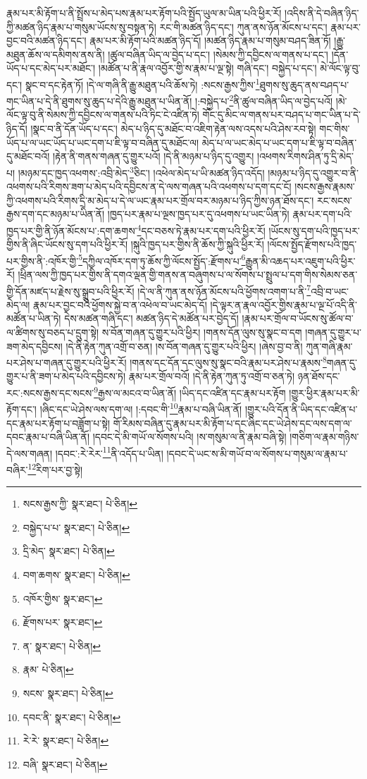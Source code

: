 རྣམ་པར་མི་རྟོག་པ་ནི་སྤྲོས་པ་མེད་པས་རྣམ་པར་རྟོག་པའི་སྤྱོད་ཡུལ་མ་ཡིན་པའི་ཕྱིར་རོ། །འདིས་ནི་དེ་བཞིན་ཉིད་ཀྱི་མཚན་ཉིད་རྣམ་པ་གསུམ་ཡོངས་སུ་བསྟན་ཏེ། རང་གི་མཚན་ཉིད་དང་། ཀུན་ནས་ཉོན་མོངས་པ་དང་། རྣམ་པར་བྱང་བའི་མཚན་ཉིད་དང་། རྣམ་པར་མི་རྟོག་པའི་མཚན་ཉིད་དོ། །མཚན་ཉིད་རྣམ་པ་གསུམ་བཤད་ཟིན་ཏོ། །རྒྱུ་མཐུན་ཆོས་ལ་དམིགས་ནས་ནི། །ཚུལ་བཞིན་ཡིད་ལ་བྱེད་པ་དང་། །སེམས་ཀྱི་དབྱིངས་ལ་གནས་པ་དང་། །དོན་ཡོད་པ་དང་མེད་པར་མཐོང་། །མཚོན་པ་ནི་རྣལ་འབྱོར་གྱི་ས་རྣམ་པ་ལྔ་སྟེ། གཞི་དང་། བསྐྱེད་པ་དང་། མེ་ལོང་ལྟ་བུ་དང་། སྣང་བ་དང་རྟེན་ཏོ། །དེ་ལ་གཞི་ནི་རྒྱུ་མཐུན་པའི་ཆོས་ཏེ། :སངས་རྒྱས་ཀྱིས་\footnote{སངས་རྒྱས་ཀྱི་  སྣར་ཐང་།  པེ་ཅིན། }ཐུགས་སུ་ཆུད་ནས་བཤད་པ་གང་ཡིན་པ་དེ་ནི་ཐུགས་སུ་ཆུད་པ་དེའི་རྒྱུ་མཐུན་པ་ཡིན་ནོ། །:བསྐྱེད་པ་\footnote{བསྐྱེད་པ་པ་  སྣར་ཐང་།  པེ་ཅིན། }ནི་ཚུལ་བཞིན་ཡིད་ལ་བྱེད་པའོ། །མེ་ལོང་ལྟ་བུ་ནི་སེམས་ཀྱི་དབྱིངས་ལ་གནས་པའི་ཏིང་ངེ་འཛིན་ཏེ། གོང་དུ་མིང་ལ་གནས་པར་བཤད་པ་གང་ཡིན་པ་དེ་ཉིད་དོ། །སྣང་བ་ནི་དོན་ཡོད་པ་དང་། མེད་པ་ཉིད་དུ་མཐོང་བ་འཇིག་རྟེན་ལས་འདས་པའི་ཤེས་རབ་སྟེ། གང་གིས་ཡོད་པ་ལ་ཡང་ཡོད་པ་ཡང་དག་པ་ཇི་ལྟ་བ་བཞིན་དུ་མཐོང་ལ། མེད་པ་ལ་ཡང་མེད་པ་ཡང་དག་པ་ཇི་ལྟ་བ་བཞིན་དུ་མཐོང་བའོ། །རྟེན་ནི་གནས་གཞན་དུ་གྱུར་པའོ། །དེ་ནི་མཉམ་པ་ཉིད་དུ་འགྱུར། །འཕགས་རིགས་ཤིན་ཏུ་དྲི་མེད་པ། །མཉམ་དང་ཁྱད་འཕགས་:འབྲི་མེད་\footnote{དྲི་མེད་  སྣར་ཐང་།  པེ་ཅིན། }ཅིང་། །འཕེལ་མེད་པ་ཡི་མཚན་ཉིད་འདོད། །མཉམ་པ་ཉིད་དུ་འགྱུར་བ་ནི་འཕགས་པའི་རིགས་ཟག་པ་མེད་པའི་དབྱིངས་ན་དེ་ལས་གཞན་པའི་འཕགས་པ་དག་དང་ངོ། །སངས་རྒྱས་རྣམས་ཀྱི་འཕགས་པའི་རིགས་དྲི་མ་མེད་པ་དེ་ལ་ཡང་རྣམ་པར་གྲོལ་བར་མཉམ་པ་ཉིད་ཀྱིས་ཉན་ཐོས་དང་། རང་སངས་རྒྱས་དག་དང་མཉམ་པ་ཡིན་ནོ། །ཁྱད་པར་རྣམ་པ་ལྔས་ཁྱད་པར་དུ་འཕགས་པ་ཡང་ཡིན་ཏེ། རྣམ་པར་དག་པའི་ཁྱད་པར་གྱི་ནི་ཉོན་མོངས་པ་:དག་ཆགས་\footnote{བག་ཆགས་  སྣར་ཐང་།  པེ་ཅིན། }དང་བཅས་ཏེ་རྣམ་པར་དག་པའི་ཕྱིར་རོ། །ཡོངས་སུ་དག་པའི་ཁྱད་པར་གྱིས་ནི་ཞིང་ཡོངས་སུ་དག་པའི་ཕྱིར་རོ། །སྐུའི་ཁྱད་པར་གྱིས་ནི་ཆོས་ཀྱི་སྐུའི་ཕྱིར་རོ། །ལོངས་སྤྱོད་རྫོགས་པའི་ཁྱད་པར་གྱིས་ནི་:འཁོར་གྱི་\footnote{འཁོར་གྱིས་  སྣར་ཐང་། }དཀྱིལ་འཁོར་དག་ཏུ་ཆོས་ཀྱི་ལོངས་སྤྱོད་:རྫོགས་པ་\footnote{རྫོགས་པར་  སྣར་ཐང་། }རྒྱུན་མི་འཆད་པར་འཇུག་པའི་ཕྱིར་རོ། །ཕྲིན་ལས་ཀྱི་ཁྱད་པར་གྱིས་ནི་དགའ་ལྡན་གྱི་གནས་ན་བཞུགས་པ་ལ་སོགས་པ་སྤྲུལ་པ་དག་གིས་སེམས་ཅན་གྱི་དོན་མཛད་པ་རྗེས་སུ་སྒྲུབ་པའི་ཕྱིར་རོ། །དེ་ལ་ནི་ཀུན་ནས་ཉོན་མོངས་པའི་ཕྱོགས་འགག་པ་ནི་\footnote{ན་  སྣར་ཐང་།  པེ་ཅིན། }འབྲི་བ་ཡང་མེད་ལ། རྣམ་པར་བྱང་བའི་ཕྱོགས་སྐྱེ་བ་ན་འཕེལ་བ་ཡང་མེད་དོ། །དེ་ལྟར་ན་རྣལ་འབྱོར་གྱིས་རྣམ་པ་ལྔ་པོ་འདི་ནི་མཚོན་པ་ཡིན་ཏེ། དེས་མཚན་གཞི་དང་། མཚན་ཉིད་དེ་མཚོན་པར་བྱེད་དོ། །རྣམ་པར་གྲོལ་བ་ཡོངས་སུ་ཚོལ་བ་ལ་ཚིགས་སུ་བཅད་པ་དྲུག་སྟེ། ས་བོན་གཞན་དུ་གྱུར་པའི་ཕྱིར། །གནས་དོན་ལུས་སུ་སྣང་བ་དག །གཞན་དུ་གྱུར་པ་ཟག་མེད་དབྱིངས། །དེ་ནི་རྟེན་ཀུན་འགྲོ་བ་ཅན། །ས་བོན་གཞན་དུ་གྱུར་པའི་ཕྱིར། །ཞེས་བྱ་བ་ནི། ཀུན་གཞི་རྣམ་པར་ཤེས་པ་གཞན་དུ་གྱུར་པའི་ཕྱིར་རོ། །གནས་དང་དོན་དང་ལུས་སུ་སྣང་བའི་རྣམ་པར་ཤེས་པ་རྣམས་\footnote{རྣམ་  པེ་ཅིན། }གཞན་དུ་གྱུར་པ་ནི་ཟག་པ་མེད་པའི་དབྱིངས་ཏེ། རྣམ་པར་གྲོལ་བའོ། །དེ་ནི་རྟེན་ཀུན་ཏུ་འགྲོ་བ་ཅན་ཏེ། ཉན་ཐོས་དང་རང་:སངས་རྒྱས་དང་སངས་\footnote{སངས་  སྣར་ཐང་།  པེ་ཅིན། }རྒྱས་ལ་མངའ་བ་ཡིན་ནོ། །ཡིད་དང་འཛིན་དང་རྣམ་པར་རྟོག །གྱུར་ཕྱིར་རྣམ་པར་མི་རྟོག་དང་། །ཞིང་དང་ཡེ་ཤེས་ལས་དག་ལ། །:དབང་གི་\footnote{དབང་ནི་  སྣར་ཐང་།  པེ་ཅིན། }རྣམ་པ་བཞི་ཡིན་ནོ། །གྱུར་པའི་དོན་ནི་ཡིད་དང་འཛིན་པ་དང་རྣམ་པར་རྟོག་པ་བཟློག་པ་སྟེ། གོ་རིམས་བཞིན་དུ་རྣམ་པར་མི་རྟོག་པ་དང་ཞིང་དང་ཡེ་ཤེས་དང་ལས་དག་ལ་དབང་རྣམ་པ་བཞི་ཡིན་ནོ། །དབང་དེ་མི་གཡོ་ལ་སོགས་པའི། །ས་གསུམ་ལ་ནི་རྣམ་བཞི་སྟེ། །གཅིག་ལ་རྣམ་གཉིས་དེ་ལས་གཞན། །དབང་:རེ་རེར་\footnote{རེ་རེ་  སྣར་ཐང་།  པེ་ཅིན། }ནི་འདོད་པ་ཡིན། །དབང་དེ་ཡང་ས་མི་གཡོ་བ་ལ་སོགས་པ་གསུམ་ལ་རྣམ་པ་བཞིར་\footnote{བཞི་  སྣར་ཐང་།  པེ་ཅིན། }རིག་པར་བྱ་སྟེ། 